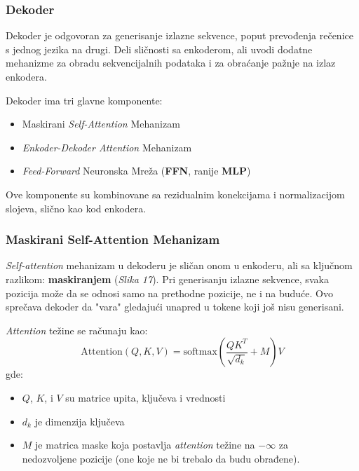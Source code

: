 \documentclass[12pt]{article}
\begin{document}
   \subsubsection{Dekoder}
   Dekoder je odgovoran za generisanje izlazne sekvence, poput prevođenja rečenice s jednog jezika 
   na drugi. Deli sličnosti sa enkoderom, ali uvodi dodatne mehanizme za obradu sekvencijalnih 
   podataka i za obraćanje pažnje na izlaz enkodera.

   Dekoder ima tri glavne komponente:
   \begin{itemize}
      \item Maskirani \textit{Self-Attention} Mehanizam
      \item \textit{Enkoder-Dekoder Attention} Mehanizam
      \item \textit{Feed-Forward} Neuronska Mreža (\textbf{FFN}, ranije \textbf{MLP})
   \end{itemize}

   Ove komponente su kombinovane sa rezidualnim konekcijama i 
   normalizacijom slojeva, slično kao kod enkodera.

   \subsubsection*{Maskirani Self-Attention Mehanizam}
   \textit{Self-attention} mehanizam u dekoderu je sličan onom u enkoderu, ali sa 
   ključnom razlikom: \textbf{maskiranjem} (\textit{Slika 17}). Pri generisanju izlazne sekvence, 
   svaka pozicija može da se odnosi samo na prethodne pozicije, ne i na buduće. 
   Ovo sprečava dekoder da "vara" gledajući unapred u tokene koji još nisu generisani.

   \textit{Attention} težine se računaju kao:
   \[
   \text{Attention}(Q, K, V) = \text{softmax}\left(\frac{QK^T}{\sqrt{d_k}} + M\right)V
   \]
   \vspace{-0.7cm}
   gde:
   \begin{itemize}
      \item \( Q \), \( K \), i \( V \) su matrice upita, ključeva i vrednosti
      \item \( d_k \) je dimenzija ključeva
      \item \( M \) je matrica maske koja postavlja \textit{attention} težine na
      $-\infty$ za \\ nedozvoljene pozicije (one koje ne bi trebalo da budu obrađene).
   \end{itemize}
\end{document}
